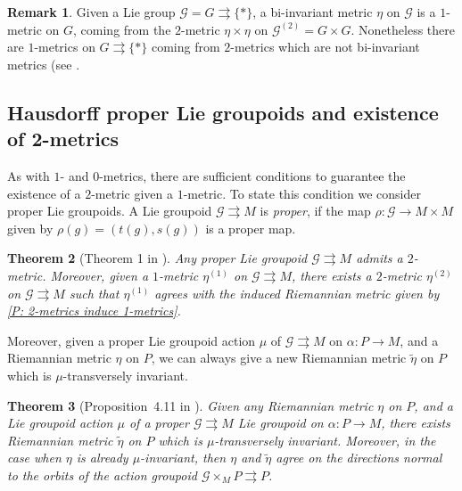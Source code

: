 \documentclass[12pt,a4paper,reqno]{amsart}
\newcommand{\1}{\mathbbm{1}} %
\newcommand{\G}{\mathcal{G}} %
\newtheorem{thm}{Theorem}[section]
\theoremstyle{definition}
\newtheorem{remark}[thm]{Remark}
\theoremstyle{TheoremNum}
\begin{document}
\begin{remark}\th\label{R: 2-metrics on Lie groups}
Given a Lie group $\G = G\rightrightarrows \{\ast\}$, a bi-invariant metric $\eta$ on $\G$ is a $1$-metric on $G$, coming from the $2$-metric $\eta\times \eta$ on $\G^{(2)} = G\times G$. Nonetheless there are $1$-metrics on $G\rightrightarrows \{\ast\}$ coming from $2$-metrics which are not bi-invariant metrics (see \cite[Example 4.4]{delHoyoFernandes2018}.
\end{remark}

\subsection{Hausdorff proper Lie groupoids and existence of 2-metr\-ics} As with  $1$- and $0$-metrics, there are sufficient conditions to guarantee the existence of a $2$-metric given a $1$-metric. To state this condition we consider proper Lie groupoids. A Lie groupoid $\G\rightrightarrows M$ is \emph{proper}, if the map $\rho\colon \G\to M\times M$ given by $\rho(g) = (t(g),s(g))$ is a proper map. 

\begin{thm}[Theorem 1 in \cite{delHoyoFernandes2018}]\th\label{P: existence of 2-metrics}
Any proper Lie groupoid $\G\rightrightarrows M$ admits a $2$-metric. Moreover, given a $1$-metric $\eta^{(1)}$ on $\G\rightrightarrows M$, there exists a $2$-metric $\eta^{(2)}$ on $\G\rightrightarrows M$ such that $\eta^{(1)}$ agrees with the induced Riemannian metric given by \th\ref{P: 2-metrics induce 1-metrics}.
\end{thm}

Moreover, given a proper Lie groupoid action $\mu$ of $\G\rightrightarrows M$ on $\alpha\colon P\to M$, and a Riemannian  metric $\eta$ on $P$, we can always give a new Riemannian metric $\tilde{\eta}$ on $P$ which is $\mu$-transversely invariant.

\begin{thm}[Proposition~4.11 in \cite{delHoyoFernandes2018}]\th\label{T: existence of G->M invariant metrics on P->M}
Given any Riemannian  metric $\eta$ on $P$, and a Lie groupoid action $\mu$ of a proper $\G\rightrightarrows M$ Lie groupoid on $\alpha\colon P\to M$, there exists Riemannian metric $\tilde{\eta}$ on $P$ which is $\mu$-transversely invariant. Moreover, in the case when $\eta$ is already $\mu$-invariant, then $\eta$ and $\tilde{\eta}$ agree on the directions normal to the orbits of the action groupoid $\G\times_M P\rightrightarrows P$.
\end{thm}
\end{document}
